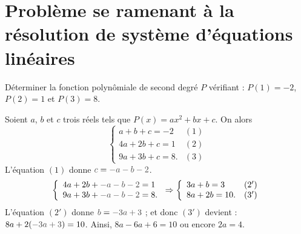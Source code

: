             \section{Probl\`eme se ramenant \`a la r\'esolution de syst\`eme d'\'equations lin\'eaires}
                  \begin{ex}
                        D\'eterminer la fonction polyn\^omiale de second degr\'e $P$ v\'erifiant :
                        $P(1) = -2$, $P(2) = 1$ et $P(3) = 8$.
                        \begin{valiny}
                              Soient $a$, $b$ et $c$ trois r\'eels tels que $P(x) = a x^2 + b x + c$.
                              On alors 
                              \[
                                    \left\lbrace
                                          \begin{array}{lc}
                                                  a +   b + c = -2    & (1)       \\
                                                4 a + 2 b + c =  1    & (2)       \\
                                                9 a + 3 b + c =  8.   & (3)       
                                          \end{array}
                                    \right.
                              \]
                              L'\'equation $(1)$ donne $\textcolor{loko1}{c} = \textcolor{loko1}{-a -b - 2}$.
                              \[
                                    \left\lbrace
                                          \begin{array}{l}
                                                4 a + 2 b + \textcolor{loko1}{-a -b - 2} =  1   \\
                                                9 a + 3 b + \textcolor{loko1}{-a -b - 2} =  8.        
                                          \end{array}
                                    \right.
                                    \Rightarrow
                                    \left\lbrace
                                          \begin{array}{lc}
                                                3 a +   b =  3    & (2')       \\
                                                8 a + 2 b = 10.   & (3')       
                                          \end{array}
                                    \right.
                              \]
                              L'\'equation $(2')$ donne $\textcolor{loko1}{b} = \textcolor{loko1}{-3a +3}$ ;
                              et donc $(3')$ devient : $ 8 a + 2 (\textcolor{loko1}{-3a +3}) = 10 $.
                              Ainsi, $ 8a - 6a + 6 = 10 $ ou encore $ 2a = 4 $.
                              

\end{valiny}
\end{ex}
